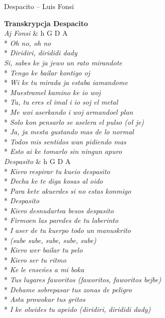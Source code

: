 \begin{piosenka_dluga}{Despacito -- Luis Fonsi}
\newpage

\textbf{\large{Transkrypcja Despacito}}\\[4mm]

\textit{Aj Fonsi} & h G D A \\*
\textit{Oh no, oh no} \\*
\textit{Diridiri, dirididi dady} \\[\zwrotkaspace]

\textit{Si, sabes ke ja jewo un rato mirandote} \\*
\textit{Tengo ke bailar kontigo oj} \\*
\textit{Wi ke tu mirada ja estaba iamandome} \\*
\textit{Muestramel kamino ke io woj} \\*
\textit{Tu, tu eres el imal i io soj el metal} \\* 
\textit{Me woi aserkando i woj armandoel plan} \\*
\textit{Solo kon pensarlo se aselera el pulso (oł je)} \\*
\textit{Ja, ja mesta gustando mas de lo normal} \\*
\textit{Todos mis sentidos wan pidiendo mas} \\*
\textit{Esto ai ke tomarlo sin ningun apuro} \\[\zwrotkaspace]

\textit{ Despasito} & h G D A \\*
\textit{ Kiero respirar tu kueio despasito} \\*
\textit{ Decha ke te diga kosas al oido} \\*
\textit{ Para kete akuerdes si no estas konmigo} \\*
\textit{ Despasito} \\*
\textit{ Kiero desnudartea besos despasito} \\*
\textit{ Firmoen las paredes de tu laberinto} \\*
\textit{ I aser de tu kuerpo todo un manuskrito} \\*
\textit{ \hspace{20mm} (sube sube, sube, sube, sube)} \\*
\textit{ Kiero wer bailar tu pelo} \\*
\textit{ Kiero ser tu ritmo} \\*
\textit{ Ke le enseńes a mi boka} \\*
\textit{ Tus lugares faworitos (faworitos, faworitos bejbe)} \\*
\textit{ Dehame sobrepasar tus zonas de peligro} \\*
\textit{ Asta prowokar tus gritos} \\*
\textit{ I ke olwides tu apeido (diridiri, dirididi dady)} \\[\zwrotkaspace]


\end{piosenka_dluga}

